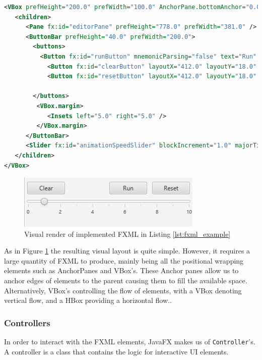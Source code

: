 \begin{lstlisting}[language=XML,morekeywords={VBox, Pane, ButtonBar, Button, Slider, AnchorPane, Insets}, caption=FXML code to generate the layout in Figure \ref{fig:fxml_view}, label=lst:fxml_example]
<VBox prefHeight="200.0" prefWidth="100.0" AnchorPane.bottomAnchor="0.0" AnchorPane.leftAnchor="0.0" AnchorPane.rightAnchor="0.0" AnchorPane.topAnchor="0.0">
   <children>
      <Pane fx:id="editorPane" prefHeight="778.0" prefWidth="381.0" />
      <ButtonBar prefHeight="40.0" prefWidth="200.0">
        <buttons>
          <Button fx:id="runButton" mnemonicParsing="false" text="Run" ButtonBar.buttonData="RIGHT" />
            <Button fx:id="clearButton" layoutX="412.0" layoutY="18.0" mnemonicParsing="false" text="Clear" ButtonBar.buttonData="LEFT" />
            <Button fx:id="resetButton" layoutX="412.0" layoutY="18.0" mnemonicParsing="false" text="Reset" ButtonBar.buttonData="RIGHT" />

        </buttons>
         <VBox.margin>
            <Insets left="5.0" right="5.0" />
         </VBox.margin>
      </ButtonBar>
      <Slider fx:id="animationSpeedSlider" blockIncrement="1.0" majorTickUnit="2.0" max="10.0" minorTickCount="1" showTickLabels="true" showTickMarks="true" value="1.0" />
   </children>
</VBox>
\end{lstlisting}

\begin{figure}[h]
    \centering
    \includegraphics{dissertation/DATA/implemented_slider_run_reset_clear.jpg}
    \caption{Visual render of implemented FXML in Listing \ref{lst:fxml_example}}
    \label{fig:fxml_view}
\end{figure}

As in Figure \ref{fig:fxml_view} the resulting visual layout is quite simple. However, it requires a large quantity of FXML to produce, mainly being all the positional wrapping elements such as AnchorPanes and VBox's. These Anchor panes allow us to anchor edges of elements to the parent causing them to fill the available space. Alternatively, VBox's controlling the flow of elements, with a VBox denoting vertical flow, and a HBox providing a horizontal flow..

\subsubsection{Controllers}\label{sec:impl_emu_controllers}
In order to interact with the FXML elements, JavaFX \cite{sunmicrosystems_2022_javafx} makes us of \texttt{Controller}'s. A controller is a class that contains the logic for interactive \ac{UI} elements.


